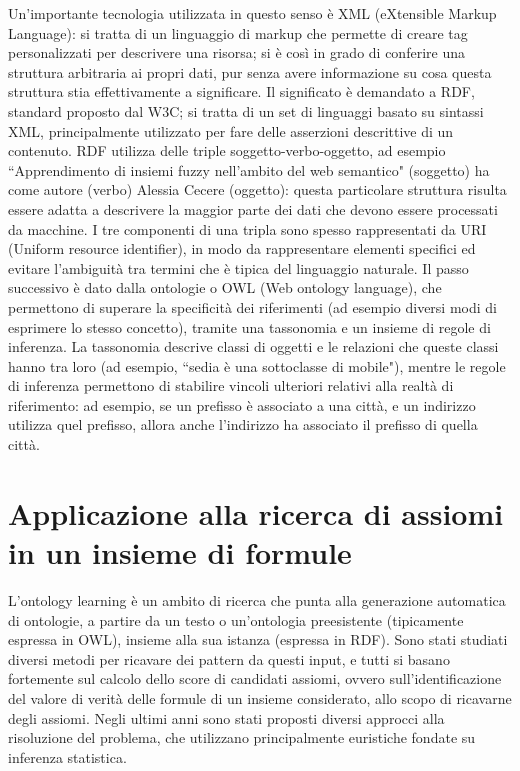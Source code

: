 \documentclass[12pt,a4paper]{report}
\begin{document}
Un'importante tecnologia utilizzata in questo senso è XML (eXtensible Markup Language): si tratta di un linguaggio di markup che permette di creare tag personalizzati per descrivere una risorsa; si è così in grado di conferire una struttura arbitraria ai propri dati, pur senza avere informazione su cosa questa struttura stia effettivamente a significare.
Il significato è demandato a RDF, standard proposto dal W3C; si tratta di un set di linguaggi basato su sintassi XML, principalmente utilizzato per fare delle asserzioni descrittive di un contenuto. RDF utilizza delle triple soggetto-verbo-oggetto, ad esempio ``Apprendimento di insiemi fuzzy nell'ambito del web semantico" (soggetto) ha come autore (verbo) Alessia Cecere (oggetto): questa particolare struttura risulta essere adatta a descrivere la maggior parte dei dati che devono essere processati da macchine.
I tre componenti di una tripla sono spesso rappresentati da URI (Uniform resource identifier), in modo da rappresentare elementi specifici ed evitare l'ambiguità tra termini che è tipica del linguaggio naturale.
Il passo successivo è dato dalla ontologie o OWL (Web ontology language), che permettono di superare la specificità dei riferimenti (ad esempio diversi modi di esprimere lo stesso concetto), tramite una tassonomia e un insieme di regole di inferenza. La tassonomia descrive classi di oggetti e le relazioni che queste classi hanno tra loro (ad esempio, ``sedia è una sottoclasse di mobile"), mentre le regole di inferenza permettono di stabilire vincoli ulteriori relativi alla realtà di riferimento: ad esempio, se un prefisso è associato a una città, e un indirizzo utilizza quel prefisso, allora anche l'indirizzo ha associato il prefisso di quella città\cite{semanticWebPaper}. 


\section{Applicazione alla ricerca di assiomi in un insieme di formule}

L'ontology learning è un ambito di ricerca che punta alla generazione automatica di ontologie, a partire da un testo o un'ontologia preesistente (tipicamente espressa in OWL), insieme alla sua istanza (espressa in RDF). Sono stati studiati diversi metodi per ricavare dei pattern da questi input, e tutti si basano fortemente sul calcolo dello score di candidati assiomi, ovvero sull'identificazione del valore di verità delle formule di un insieme considerato, allo scopo di ricavarne degli assiomi.
Negli ultimi anni sono stati proposti diversi approcci alla risoluzione del problema, che utilizzano principalmente euristiche fondate su inferenza statistica.
\end{document}
